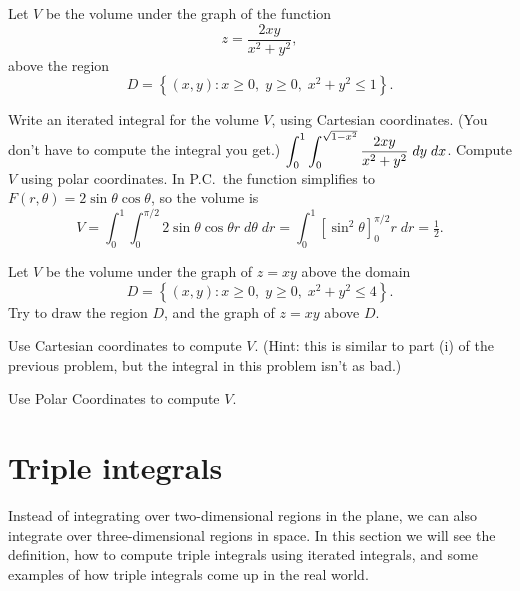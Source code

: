 \problem Let $V$ be the volume under the graph of the function 
\[
z=\frac{2xy}{x^2+y^2},
\]
above the region 
\[
D = \left\{ (x, y) : x\ge0,\;  y\ge0,\; x^2+y^2\le1 \right\}.
\]

\subprob Write an iterated integral for the volume $V$, using 
Cartesian coordinates.  (You don't have to compute the integral you
get.)
\answer
$\displaystyle\int_0^1 \int_0^{\sqrt{1-x^2}} \frac{2xy}{x^2+y^2}\; dy\; dx$.
\endanswer
\subprob Compute $V$ using polar coordinates. 
\answer
In P.C.\ the function simplifies to $F(r,\theta) = 2\sin \theta\cos
\theta$, so the volume is
\[
V = \int_0^1 \int_0^{\pi/2} 2\sin\theta\cos\theta r\; d\theta\; dr
=\int_0^1 \left[ \sin^2\theta \right]_0^{\pi/2} r\; dr
=\tfrac12.
\]
\endanswer

\problem  Let $V$ be the volume 
under the graph of $z=xy$ above the domain
\[
D = \left\{ (x, y) : x\ge0,\;  y\ge0,\; x^2+y^2\le 4 \right\}.
\]
Try to draw the region $D$, and the graph of $z=xy$ above $D$.

\subprob Use Cartesian coordinates to compute $V$. 
(Hint: this is similar to part \textsf{(i)} of the previous problem,
but the integral in this problem isn't as bad.)

\subprob Use Polar Coordinates to compute $V$.  
\noproblemfont


\section{Triple integrals}  
Instead of integrating over two-dimensional regions in the plane, we
can also integrate over three-dimensional regions in space.  In this
section we will see the definition, how to compute triple integrals
using iterated integrals, and some examples of how triple integrals
come up in the real world.

